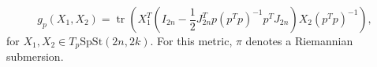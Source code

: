 
\begin{equation}\label{eq:spst_metric}
    g_{p}(X_{1},X_{2})=\operatorname{tr}\left(X_{1}^{T}\left(I_{2n}- \frac{1}{2}J_{2n}^{T}p(p^{T}p)^{-1}p^{T}J_{2n}\right)X_{2}(p^{T}p)^{-1}\right),
\end{equation}
for $X_{1},X_{2}\in T_{p}\mathrm{SpSt}(2n, 2k)$. For this metric, $\pi$ denotes a Riemannian submersion.

